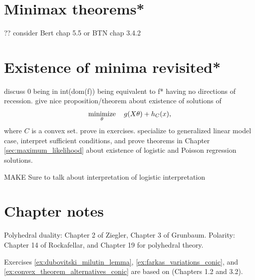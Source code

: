 \section{Minimax theorems*}
\label{sec:minimax_theorems}

?? consider Bert chap 5.5 or BTN chap 3.4.2 

\section{Existence of minima revisited*}
\label{sec:existence_minima_revisited}

discuss 0 being in int(dom(f)) being equivalent to f* having no directions
of recession.  give nice proposition/theorem about existence of solutions of 
$$
\operatorname*{minimize}_\theta \quad g(X \theta) + h_C(x),
$$
where $C$ is a convex set. prove in exercises. specialize to generalized linear
model case, interpret sufficient conditions, and prove theorems in Chapter
\ref{sec:maximum_likelihood} about existence of logistic and Poisson regression
solutions. 


MAKE Sure to talk about interpretation of logistic interpretation

\SkipTocEntry\section*{Chapter notes}

Polyhedral duality: Chapter 2 of Ziegler, Chapter 3 of Grunbaum.
Polarity: Chapter 14 of Rockafellar, and Chapter 19 for polyhedral theory.

Exercises \ref{ex:dubovitski_milutin_lemma}, \ref{ex:farkas_variations_conic}, 
and \ref{ex:convex_theorem_alternatives_conic} are based on
\cite{bental2023convex} (Chapters 1.2 and 3.2). 

\clearpage


